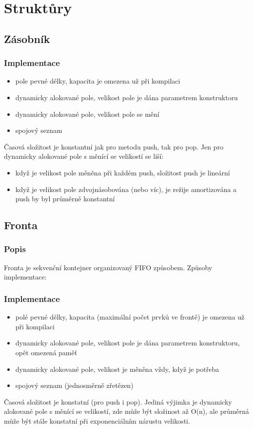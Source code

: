 \documentclass{szzclass}
\begin{document}
\section{Struktůry}
\subsection{Zásobník}
\subsubsection{Implementace}
\begin{itemize}
    \item pole pevné délky, kapacita je omezena už při kompilaci
    \item dynamicky alokované pole, velikost pole je dána parametrem konstruktoru
    \item dynamicky alokované pole, velikost pole se mění
    \item spojový seznam
\end{itemize}
Časová složitost je konstantní jak pro metodu push, tak pro pop. Jen pro dynamicky alokované pole s měnící se velikostí se liší:
\begin{itemize}
    \item když je velikost pole měněna při každém push, složitost push je lineární
    \item když je velikost pole zdvojnásobována (nebo víc), je režije amortizována a push by byl průměrně konstantní
\end{itemize}
\subsection{Fronta}
\subsubsection{Popis}
Fronta je sekvenční kontejner organizovaný FIFO způsobem. Způsoby implementace:
\subsubsection{Implementace}
\begin{itemize}
    \item polé pevné délky, kapacita (maximální počet prvků ve frontě) je omezena už při kompilaci
    \item dynamicky alokované pole, velikost pole je dána parametrem konstruktoru, opět omezená paměť
    \item dynamicky alokované pole, velikost je měněna vždy, když je potřeba
    \item spojový seznam (jednosměrně zřetězen)
\end{itemize}
Časová složitost je konstatní (pro push i pop). Jediná výjimka je dynamicky alokované pole s měnící se velikostí, zde
může být složinost až O(n), ale průměrná může být stále konstatní při exponenciálním nárustu velikosti.
\end{document}
